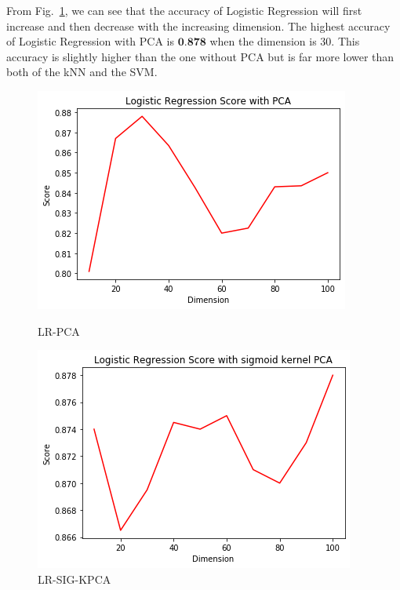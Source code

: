 \documentclass[12pt]{article}
\begin{document}
From Fig.~\ref{fig:LR-PCA}, we can see that the accuracy of Logistic Regression will first increase and then decrease with the increasing dimension. The highest accuracy of Logistic Regression with PCA is $\textbf{0.878}$ when the dimension is 30. This accuracy is slightly higher than the one without PCA but is far more lower than both of the kNN and the SVM.
\begin{figure}[htb]
	\centering
	\begin{minipage}{.3\textwidth}
		\centering
		\includegraphics[width=\linewidth]{./exp-figs/LR-PCA.png}
		\caption{LR-PCA}
		\label{fig:LR-PCA}
	\end{minipage}%
	\begin{minipage}{0.3\textwidth}
		\centering
		\includegraphics[width=\linewidth]{./exp-figs/LR-SIG-KPCA.png}
		\caption{LR-SIG-KPCA}

\end{minipage}
\end{figure}
\end{document}
